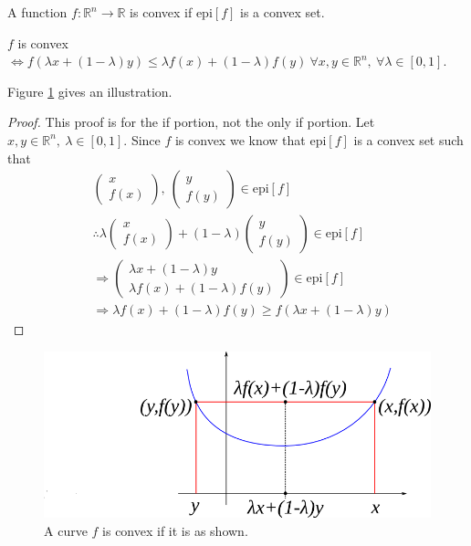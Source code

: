 \documentclass[lecture,12pt,]{pcms-l}
\begin{document}
\begin{definition}
A function $f:\mathbb{R}^n\to\mathbb{R}$ is convex if $\text{epi}[f]$ is a convex set.
\end{definition}

\begin{theorem}
$f$ is convex $\Leftrightarrow f(\lambda x + (1-\lambda)y)\leq \lambda f(x) + (1-\lambda)f(y) ~\forall x,y\in\mathbb{R}^n, ~\forall \lambda\in[0,1]$.
\end{theorem}
Figure \ref{fig:05convexGeoProof} gives an illustration.
\begin{proof}
This proof is for the if portion, not the only if portion. Let $x,y\in\mathbb{R}^n, ~\lambda\in[0,1]$. Since $f$ is convex we know that $\text{epi}[f]$ is a convex set such that
\begin{align*}
&\left(\begin{array}{c} x \\ f(x) \end{array}\right), ~\left(\begin{array}{c} y \\ f(y) \end{array}\right) \in \text{epi}[f] \\
&\therefore \lambda\left(\begin{array}{c} x \\ f(x) \end{array}\right) + (1-\lambda)\left(\begin{array}{c} y \\ f(y) \end{array}\right) \in \text{epi}[f] \\
&\Rightarrow \left(\begin{array}{c} \lambda x+(1-\lambda)y \\ \lambda f(x) + (1-\lambda)f(y) \end{array}\right) \in \text{epi}[f] \\
&\Rightarrow \lambda f(x) + (1-\lambda)f(y) \geq f(\lambda x + (1-\lambda)y)
\end{align*}
\end{proof}

\begin{figure}[ht!]
	\centering
	\includegraphics[width=.5\textwidth]{images/05convexGeoProof}
	\caption{A curve $f$ is convex if it is as shown.}
	\label{fig:05convexGeoProof}
\end{figure}
\end{document}
